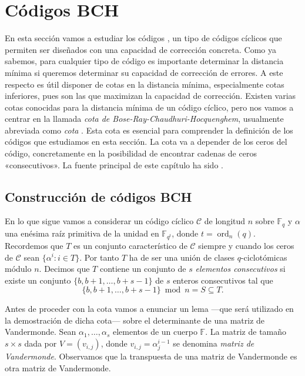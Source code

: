 

\chapter{Códigos BCH}


En esta sección vamos a estudiar los códigos , un tipo de códigos cíclicos que permiten ser diseñados con una capacidad de corrección concreta.
Como ya sabemos, para cualquier tipo de código es importante determinar la distancia mínima si queremos determinar su capacidad de corrección de errores.
A este respecto es útil disponer de cotas en la distancia mínima, especialmente cotas inferiores, pues son las que maximizan la capacidad de corrección.
Existen varias cotas conocidas para la distancia mínima de un código cíclico, pero nos vamos a centrar en la llamada \textit{cota de Bose-Ray-Chaudhuri-Hocquenghem}, usualmente abreviada como \textit{cota }.
Esta cota es esencial para comprender la definición de los códigos  que estudiamos en esta sección.
La cota  va a depender de los ceros del código, concretamente en la posibilidad de encontrar cadenas de ceros «consecutivos».
La fuente principal de este capítulo ha sido \parencite{huffman_fundamentals_2003}.

\section{Construcción de códigos BCH}

En lo que sigue vamos a considerar un código cíclico \(\mathcal C\)  de longitud \(n\) sobre \(\mathbb F_q\) y \(\alpha\) una enésima raíz primitiva de la unidad en \(\mathbb F_{q^t}\), donde \(t = \operatorname{ord}_n(q)\).
Recordemos que \(T\) es un conjunto característico de \(\mathcal C\) siempre y cuando los ceros de \(\mathcal C\) sean \(\{\alpha^{i} : i \in T\}\).
Por tanto \(T\) ha de ser una unión de clases \(q\)-ciclotómicas módulo \(n\).
Decimos que \(T\) contiene un conjunto de \(s\) \textit{elementos consecutivos} si existe un conjunto \(\{b, b + 1, \dots, b + s - 1\}\) de \(s\) enteros consecutivos tal que
\[
  \{b, b + 1, \dots, b + s - 1\} \bmod n = S \subseteq T.
\]

Antes de proceder con la cota  vamos a enunciar un lema —que será utilizado en la demostración de dicha cota— sobre el determinante de una matriz de Vandermonde.
Sean \(\alpha_1, \dots, \alpha_s\) elementos de un cuerpo \(\mathbb F\).
La matriz de tamaño \(s \times s\) dada por \(V = (v_{i, j})\), donde \(v_{i,j} = \alpha_{j}^{i-1}\) se denomina \textit{matriz de Vandermonde}.
Observamos que la transpuesta de una matriz de Vandermonde es otra matriz de Vandermonde.

